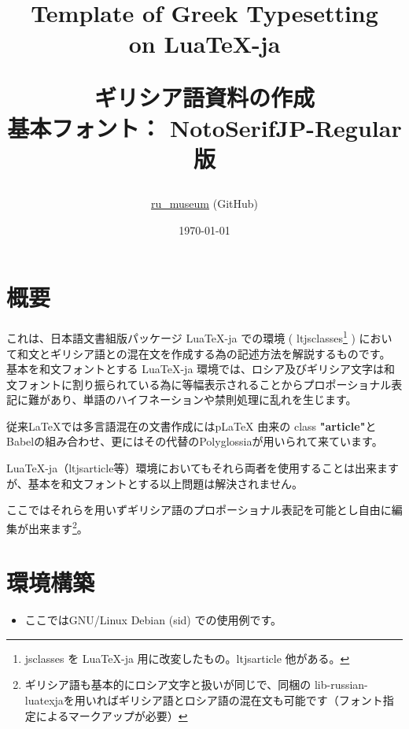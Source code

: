 \documentclass[a4paper,10pt]{ltjsarticle}
\title{
  \huge Template of Greek Typesetting\\ on Lua\TeX{}-ja\vspace{16mm} \par
  \Large{ギリシア語資料の作成}\vspace{6mm}\\
  \small{基本フォント： NotoSerifJP-Regular 版}
  \par\vspace{120mm}
}
\author{\href{https://github.com/ru-museum/}{ru\_museum} (GitHub)}
\date{\today}
\def\colH#1{\color[HTML]{#1}}
\begin{document}
\maketitle
\thispagestyle{empty}

\newpage
  
\tableofcontents
\thispagestyle{empty}

\newpage

\section{概要}
これは、日本語文書組版パッケージ {\colH{800000} LuaTeX-ja} での環境 ( {\colH{800000} ltjsclasses}\footnote{jsclasses を LuaTeX-ja 用に改変したもの。ltjsarticle 他がある。} ) において和文とギリシア語との混在文を作成する為の記述方法を解説するものです。\vspace{6pt}\\
基本を和文フォントとする LuaTeX-ja 環境では、ロシア及びギリシア文字は和文フォントに割り振られている為に{\gtfamily 等幅表示}されることから{\gtfamily プロポーショナル表記}に難があり、単語のハイフネーションや禁則処理に乱れを生じます。\vspace{6pt}\par

従来LaTeX{}では多言語混在の文書作成にはp\LaTeX{} 由来の class \textbf{"article"}と{\fRoboto\gtfamily Babel}の組み合わせ、更にはその代替の{\fRoboto\gtfamily Polyglossia}が用いられて来ています。\vspace{6pt}\par

LuaTeX-ja（ltjsarticle等）環境においてもそれら両者を使用することは出来ますが、基本を和文フォントとする以上問題は解決されません。\vspace{6pt}\par

ここではそれらを用いずギリシア語のプロポーショナル表記を可能とし自由に編集が出来ます\footnote{ギリシア語も基本的にロシア文字と扱いが同じで、同梱の{\colH{800000} lib-russian-luatexja}を用いればギリシア語とロシア語の混在文も可能です（フォント指定によるマークアップが必要）}。\vspace{-2mm}

\section{環境構築}
\vspace{-2mm}
\begin{itemize} 
  \item ここではGNU/Linux Debian (sid) での使用例です。\vspace{-4mm}
\end{itemize}
\end{document}
